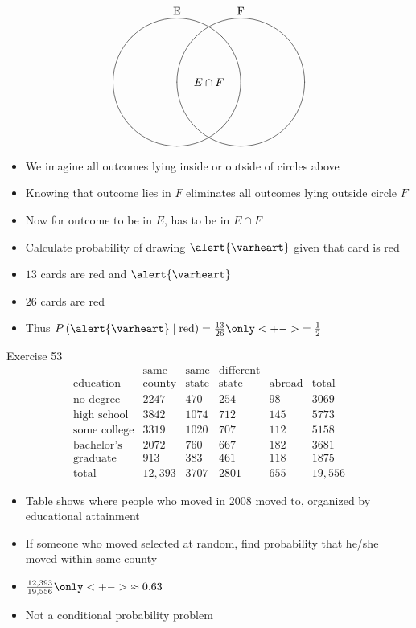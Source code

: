 \documentclass{beamer}
\theoremstyle{definition}
\begin{document}
\begin{frame}
\[\begin{xy}<1cm,0cm>:
(-1,2)*+!D{\text{E}};
(1,2)*+!D{\text{F}};
(-1,0)*\cir<2cm>{};
(1,0)*\cir<2cm>{};
(0,0)*{E\cap F};
\end{xy}\]
\begin{itemize}
\item We imagine all outcomes lying inside
or outside of circles above
\item Knowing that outcome lies in $F$
eliminates all outcomes lying outside circle $F$
\item Now for outcome to be in $E$, has to be in $E\cap F$
\end{itemize}
\end{frame}

\begin{frame}
\begin{example}
\begin{itemize}
\item Calculate probability of drawing $\alert{\varheart}$ given
that card is red
\item $13$ cards are red and $\alert{\varheart}$
\item $26$ cards are red
\item Thus $P\left(\alert{\varheart}\mid\text{red}\right)
=\frac{13}{26}\only<+->{=\frac{1}{2}}$
\end{itemize}
\end{example}
\end{frame}

\begin{frame}{Exercise 53}
\[\begin{array}{r|llll|l}
&\text{same}&\text{same}&\text{different}&&\\
\text{education}&\text{county}
&\text{state}&\text{state}&\text{abroad}&\text{total}\\\hline
\text{no degree}&2247&470&254&98&3069\\
\text{high school}&3842&1074&712&145&5773\\
\text{some college}&3319&1020&707&112&5158\\
\text{bachelor's}&2072&760&667&182&3681\\
\text{graduate}&913&383&461&118&1875\\\hline
\text{total}&12,393&3707&2801&655&19,556
\end{array}\]
\begin{itemize}
\item Table shows where people who moved in 2008
moved to, organized by educational attainment
\item If someone who moved selected at random, find probability
that he/she moved within same county
\item $\frac{12,393}{19,556}\only<+->{\approx 0.63}$
\item Not a conditional probability problem
\end{itemize}
\end{frame}
\end{document}
